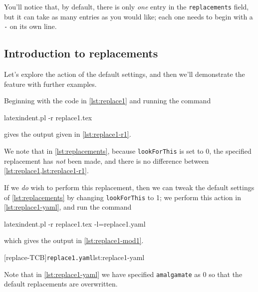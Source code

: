 \documentclass[10pt]{article}
\begin{document}
 You'll notice that, by default, there is only \emph{one} entry in the
 \texttt{replacements} field, but it can take as many entries as you would like; each one
 needs to begin with a \texttt{-} on its own line.

\subsection{Introduction to replacements}
 Let's explore the action of the default settings, and then we'll demonstrate the feature
 with further examples.

 \begin{example}
 Beginning with the code in \cref{lst:replace1} and running the command

 \begin{commandshell}
latexindent.pl -r replace1.tex
\end{commandshell}

 gives the output given in \cref{lst:replace1-r1}.

 \begin{cmhtcbraster}[raster column skip=.01\linewidth]
 \end{cmhtcbraster}

 We note that in \cref{lst:replacements}, because \texttt{lookForThis} is set to 0, the
 specified replacement has \emph{not} been made, and there is no difference between
 \cref{lst:replace1,lst:replace1-r1}.

 If we \emph{do} wish to perform this replacement, then we can tweak the default settings
 of \vref{lst:replacements} by changing \texttt{lookForThis} to 1; we perform this action
 in \cref{lst:replace1-yaml}, and run the command 

 \begin{commandshell}
latexindent.pl -r replace1.tex -l=replace1.yaml
\end{commandshell}

 which gives the output in \cref{lst:replace1-mod1}.

 \begin{cmhtcbraster}[raster column skip=.01\linewidth]
  [replace-TCB]{\texttt{replace1.yaml}}{lst:replace1-yaml}
 \end{cmhtcbraster}

 Note that in \cref{lst:replace1-yaml} we have specified \texttt{amalgamate} as 0 so that
 the default replacements are overwritten.
 \end{example}
\end{document}
